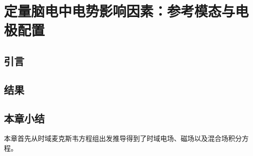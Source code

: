 \chapter{定量脑电中电势影响因素：参考模态与电极配置}
\section{引言}
\begin{flushright}
	
\end{flushright}
\section{结果}

\section{本章小结}
本章首先从时域麦克斯韦方程组出发推导得到了时域电场、磁场以及混合场积分方程。
